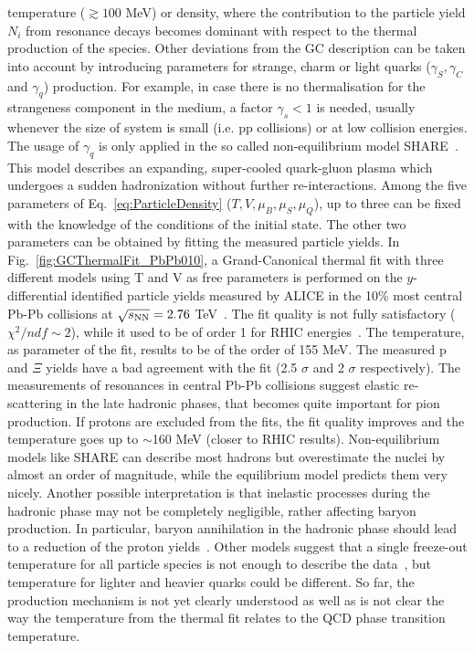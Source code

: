 temperature ($\gtrsim 100 $ MeV) or density, where the contribution 
to the particle yield $N_{i}$ from resonance decays becomes 
dominant with respect to the thermal production of the species. 
Other deviations from the GC description can be taken into 
account by introducing parameters for strange, charm or 
light quarks ($\gamma_{S}, \gamma_{C}$ and $\gamma_{q}$) 
production. For example, in case there is no thermalisation for 
the strangeness component in the medium, a factor 
$\gamma_{s}<1$ is needed, usually whenever the size of system 
is small (i.e. pp collisions) or at low collision energies. 
The usage of $\gamma_{q}$ is only applied in the so called 
non-equilibrium model SHARE~\cite{Petran:2013lja}. This model 
describes an expanding, super-cooled quark-gluon plasma which 
undergoes a sudden hadronization without further re-interactions.
Among the five parameters of Eq.~\ref{eq:ParticleDensity} 
($T, V, \mu_B, \mu_S, \mu_Q$), up to three can be fixed with
 the knowledge of the conditions of the initial state. 
 The other two parameters can be obtained by fitting the measured
  particle yields. In Fig.~\ref{fig:GCThermalFit_PbPb010}, a 
  Grand-Canonical thermal fit with three different models using 
  T and V as free parameters is performed on the $y$-differential 
  identified particle yields measured by ALICE in the 10\% most 
  central Pb-Pb collisions at $\sqrt{s_{\rm NN}} = 2.76$ TeV~\cite{Floris:2014pta}. 
  The fit quality is not fully satisfactory ($\chi^{2}/ndf \sim 2$), 
  while it used to be of order 1 for RHIC energies~\cite{Andronic:2008gu}. 
  The temperature, as parameter of the fit, results to be of the order of 155 MeV. 
The measured p and $\Xi$ yields have a bad agreement with the fit 
(2.5 $\sigma$ and 2 $\sigma$ respectively). The measurements of resonances 
in central Pb-Pb collisions suggest elastic re-scattering in the late 
hadronic phases, that becomes quite important for pion production. 
If protons are excluded from the fits, the fit quality improves and the 
temperature goes up to $\sim$160 MeV (closer to RHIC results). 
Non-equilibrium models like SHARE can describe most hadrons  
but overestimate the nuclei by almost an order of magnitude, 
while the equilibrium model predicts them very nicely. Another possible
interpretation is that inelastic processes during the hadronic phase may
not be completely negligible, rather affecting baryon production. In 
particular, baryon annihilation in the hadronic phase should lead
to a reduction of the proton yields~\cite{Becattini:2014hla,Becattini:2012xb}. Other models 
suggest that a single freeze-out temperature for all particle species is not enough to describe
 the data~\cite{Bellwied:2013cta}, but temperature for lighter and heavier
  quarks could be different. So far, the production mechanism is not yet 
  clearly understood as well as is not clear the way the temperature from the thermal 
  fit relates to the QCD phase transition temperature.
  
